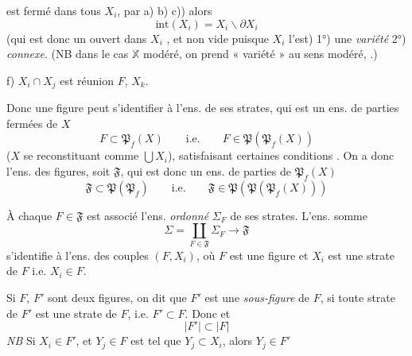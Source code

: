 \documentclass[11pt,a4paper]{article}
\begin{document}
est fermé dans tous  $X_i$, par a) b) c)) alors
\[
  \mathrm{int}(X_i) = X_i \smallsetminus \partial X_i
\]
(qui est donc un ouvert  dans $X_i$ , et non vide puisque $X_i$ l'est) \struck{\ill{}}  1°) une \emph{variété} 2°) \emph{connexe}. (NB dans le cas $\mathbb{X}$ modéré, on prend « variété » au sens modéré, .)

f) $X_i \cap X_j$ est réunion  $F$, $X_k$.

Donc une figure  peut s'identifier à l'ens. de ses strates, qui est un ens. de parties fermées de $X$
\[
  F \subset \mathfrak{P}_f(X) \qquad \text{i.e.} \qquad F \in \mathfrak{P}(\mathfrak{P}_f(X))
\]
($X$ se reconstituant  comme $\bigcup X_i$), satisfaisant certaines conditions . On a donc l'ens. des figures, \struck{\ill{}} soit $\mathfrak{F}$, qui est donc un ens. de parties de $\mathfrak{P}_f(X)$
\[
  \mathfrak{F} \subset \mathfrak{P}(\mathfrak{P}_f) \qquad \text{i.e.} \qquad \mathfrak{F} \in \mathfrak{P}(\mathfrak{P}(\mathfrak{P}_f(X)))
\]

À chaque $F \in \mathfrak{F}$ est associé l'ens. \emph{ordonné} $\Sigma_F$ de ses strates. L'ens. somme
\[
  \Sigma = \coprod_{F \in \mathfrak{F}} \Sigma_F \longrightarrow \mathfrak{F}
\]
s'identifie à l'ens. des couples $(F, X_i)$, \struck{\ill{}} où $F$ est une figure et $X_i$ est une strate de $F$ i.e. $X_i \in F$.

Si $F$, $F'$ sont deux figures, on dit que $F'$ est une \emph{sous-figure} de $F$, si toute strate de $F'$ est une strate de $F$, i.e. $F' \subset F$. Donc    et
\[
  |F'| \subset |F|
\]
\emph{NB} Si $X_i \in F'$, et $Y_j \in F$ est tel que $Y_j \subset X_i$, alors $Y_j \in F'$  
\end{document}
